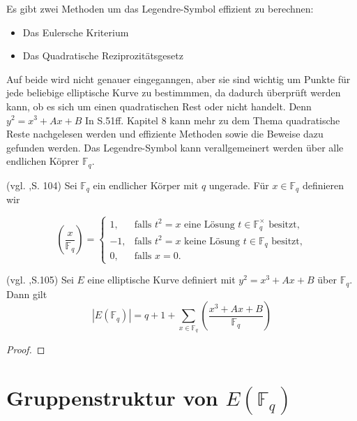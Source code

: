     Es gibt zwei Methoden um das Legendre-Symbol effizient zu berechnen:
    \begin{itemize}
        \item Das Eulersche Kriterium
        \item Das Quadratische Reziprozitätsgesetz
    \end{itemize}
    Auf beide wird nicht genauer eingeganngen, aber sie sind wichtig um Punkte für jede beliebige elliptische Kurve zu bestimmmen, da dadurch überprüft werden kann, ob es sich um einen quadratischen Rest oder nicht handelt.
    Denn \(y^2=x^3+Ax+B\)
    In \cite{muller} S.51ff. Kapitel 8 kann mehr zu dem Thema quadratische Reste nachgelesen werden und effiziente Methoden sowie die Beweise dazu gefunden werden.
    Das Legendre-Symbol kann verallgemeinert werden über alle endlichen Köprer $\mathbb{F}_q$.
    \begin{definition}
    (vgl. \cite{washington08},S. 104)
    Sei \(\mathbb F_q\) ein endlicher Körper mit \(q\) ungerade. Für \(x\in\mathbb F_q\) definieren wir
    
    \[
    \left(\frac{x}{\mathbb F_q}\right)
    =
    \begin{cases}
    1, & \text{falls } t^2=x \text{ eine Lösung } t\in\mathbb F_q^\times \text{ besitzt},\\
    -1, & \text{falls } t^2=x \text{ keine Lösung } t\in\mathbb F_q \text{ besitzt},\\
    0, & \text{falls } x=0.
    \end{cases}
    \]
    
    \end{definition}
    \begin{theorem}  (vgl. \cite{washington08},S.105)
        Sei $E$ eine elliptische Kurve definiert mit \(y^2=x^3+Ax+B\) über $\mathbb{F}_q$. Dann gilt 
        \[
        |E(\mathbb{F}_q)|=q+1+\sum_{x\in\mathbb{F}_q}\left(\frac{x^3+Ax+B}{\mathbb{F}_q}\right)
        \]
    \end{theorem}
    \begin{proof}
        
    \end{proof}
    
\section{Gruppenstruktur von \(E(\mathbb{F}_q)\)}

